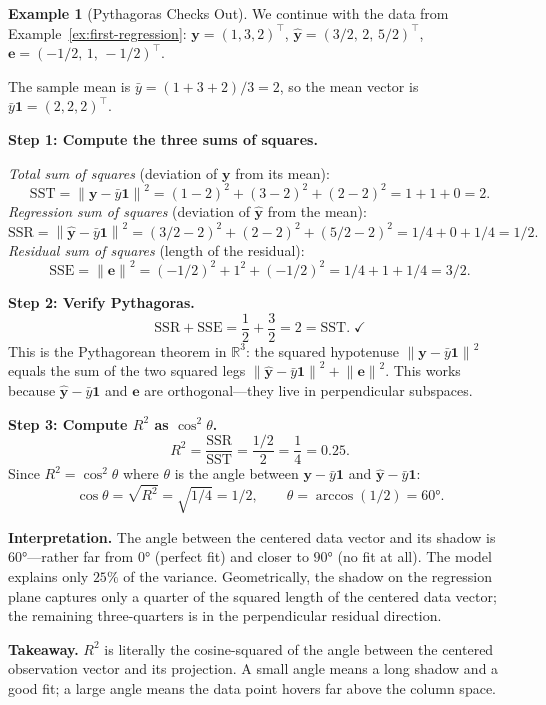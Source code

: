 \documentclass[11pt,a4paper]{article}
\theoremstyle{plain}
\theoremstyle{definition}
\newtheorem{example}[theorem]{Example}
\newcommand{\R}{\mathbb{R}}
\newcommand{\yhat}{\hat{\bm{y}}}
\newcommand{\by}{\bm{y}}
\newcommand{\be}{\bm{e}}
\newcommand{\norm}[1]{\left\lVert #1 \right\rVert}
\begin{document}
\begin{example}[Pythagoras Checks Out]\label{ex:pythagoras}
We continue with the data from Example~\ref{ex:first-regression}:
$\by = (1,3,2)^\top$, $\yhat = (3/2,\, 2,\, 5/2)^\top$,
$\be = (-1/2,\, 1,\, -1/2)^\top$.

The sample mean is $\bar{y} = (1+3+2)/3 = 2$, so the mean vector is
$\bar{y}\bm{1} = (2, 2, 2)^\top$.

\medskip\noindent\textbf{Step 1: Compute the three sums of squares.}

\emph{Total sum of squares} (deviation of $\by$ from its mean):
\[
\text{SST} = \norm{\by - \bar{y}\bm{1}}^2
= (1-2)^2 + (3-2)^2 + (2-2)^2
= 1 + 1 + 0 = 2.
\]
\emph{Regression sum of squares} (deviation of $\yhat$ from the mean):
\[
\text{SSR} = \norm{\yhat - \bar{y}\bm{1}}^2
= (3/2-2)^2 + (2-2)^2 + (5/2-2)^2
= 1/4 + 0 + 1/4 = 1/2.
\]
\emph{Residual sum of squares} (length of the residual):
\[
\text{SSE} = \norm{\be}^2
= (-1/2)^2 + 1^2 + (-1/2)^2
= 1/4 + 1 + 1/4 = 3/2.
\]

\medskip\noindent\textbf{Step 2: Verify Pythagoras.}
\[
\text{SSR} + \text{SSE} = \frac{1}{2} + \frac{3}{2} = 2 = \text{SST}.\;\checkmark
\]
This is the Pythagorean theorem in $\R^3$:
the squared hypotenuse $\norm{\by - \bar{y}\bm{1}}^2$ equals the sum of the two squared legs
$\norm{\yhat - \bar{y}\bm{1}}^2 + \norm{\be}^2$.
This works because $\yhat - \bar{y}\bm{1}$ and $\be$ are orthogonal---they live in perpendicular subspaces.

\medskip\noindent\textbf{Step 3: Compute $R^2$ as $\cos^2\theta$.}
\[
R^2 = \frac{\text{SSR}}{\text{SST}} = \frac{1/2}{2} = \frac{1}{4} = 0.25.
\]
Since $R^2 = \cos^2\theta$ where $\theta$ is the angle between
$\by - \bar{y}\bm{1}$ and $\yhat - \bar{y}\bm{1}$:
\[
\cos\theta = \sqrt{R^2} = \sqrt{1/4} = 1/2,
\qquad
\theta = \arccos(1/2) = 60°.
\]

\medskip\noindent\textbf{Interpretation.}
The angle between the centered data vector and its shadow
is $60°$---rather far from $0°$ (perfect fit) and closer to $90°$ (no fit at all).
The model explains only $25\%$ of the variance.
Geometrically, the shadow on the regression plane captures only
a quarter of the squared length of the centered data vector;
the remaining three-quarters is in the perpendicular residual direction.

\medskip\noindent\textbf{Takeaway.}
$R^2$ is literally the cosine-squared of the angle between the centered
observation vector and its projection.
A small angle means a long shadow and a good fit;
a large angle means the data point hovers far above the column space.
\end{example}
\end{document}
